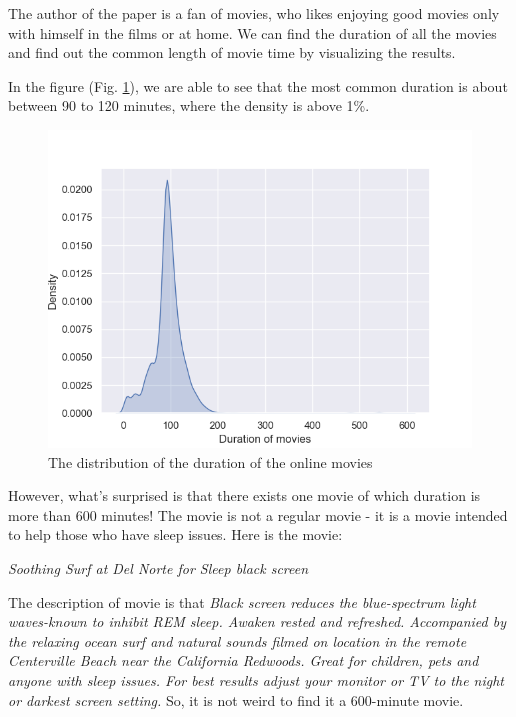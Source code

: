 \documentclass{article}
\begin{document}
The author of the paper is a fan of movies, who likes enjoying good movies only 
with himself in the films or at home. We can find the duration of all the movies 
and find out the common length of movie time by visualizing the results.

In the figure (Fig. \ref{fig:movie_duration}), we are able to see that the most 
common duration is about between 90 to 120 minutes, where the density is above 1\%.

\begin{figure}[!htb]
	\centering
	\includegraphics[scale=0.6]{../movie_duration_distribution.png}
	\caption{The distribution of the duration of the online movies}
	\label{fig:movie_duration}
\end{figure}

However, what's surprised is that there exists one movie of which duration is 
more than 600 minutes! The movie is not a regular movie - it is a movie intended 
to help those who have sleep issues. Here is the movie:

\begin{center}
	{\it Soothing Surf at Del Norte for Sleep black screen}
\end{center}

The description of movie is that {\it Black screen reduces the blue-spectrum light 
waves-known to inhibit REM sleep. Awaken rested and refreshed. Accompanied by the 
relaxing ocean surf and natural sounds filmed on location in the remote 
Centerville Beach near the California Redwoods. Great for children, pets and 
anyone with sleep issues. For best results adjust your monitor or TV to the night 
or darkest screen setting.} So, it is not weird to find it a 600-minute movie.
\end{document}
